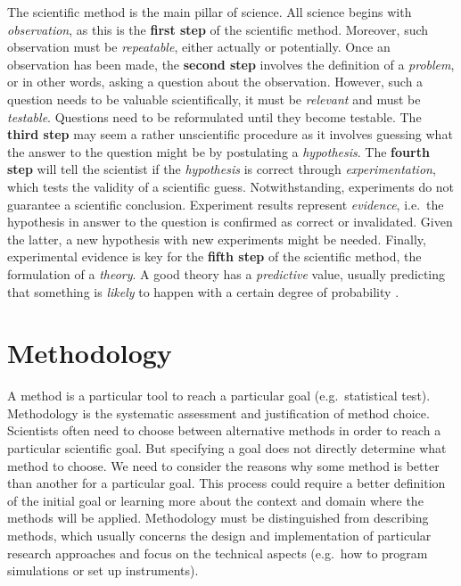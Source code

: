 \documentclass[
  12pt,
]{book}
\begin{document}
The scientific method is the main pillar of science. All science begins with \emph{observation}, as this is the \textbf{first step} of the scientific method. Moreover, such observation must be \emph{repeatable}, either actually or potentially. Once an observation has been made, the \textbf{second step} involves the definition of a \emph{problem}, or in other words, asking a question about the observation. However, such a question needs to be valuable scientifically, it must be \emph{relevant} and must be \emph{testable}. Questions need to be reformulated until they become testable. The \textbf{third step} may seem a rather unscientific procedure as it involves guessing what the answer to the question might be by postulating a \emph{hypothesis}. The \textbf{fourth step} will tell the scientist if the \emph{hypothesis} is correct through \emph{experimentation}, which tests the validity of a scientific guess. Notwithstanding, experiments do not guarantee a scientific conclusion. Experiment results represent \emph{evidence}, i.e.~the hypothesis in answer to the question is confirmed as correct or invalidated. Given the latter, a new hypothesis with new experiments might be needed. Finally, experimental evidence is key for the \textbf{fifth step} of the scientific method, the formulation of a \emph{theory}. A good theory has a \emph{predictive} value, usually predicting that something is \emph{likely} to happen with a certain degree of probability \citep{pos-nidditch}.

\section{Methodology}\label{methodology}

A method is a particular tool to reach a particular goal (e.g.~statistical test). Methodology is the systematic assessment and justification of method choice. Scientists often need to choose between alternative methods in order to reach a particular scientific goal. But specifying a goal does not directly determine what method to choose. We need to consider the reasons why some method is better than another for a particular goal. This process could require a better definition of the initial goal or learning more about the context and domain where the methods will be applied. Methodology must be distinguished from describing methods, which usually concerns the design and implementation of particular research approaches and focus on the technical aspects (e.g.~how to program simulations or set up instruments).
\end{document}

